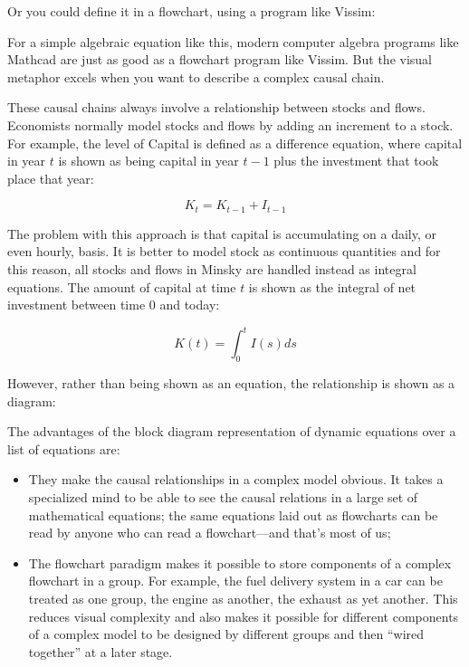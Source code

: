 Or you could define it in a flowchart, using a program like Vissim:

\begin{center}
\end{center}

For a simple algebraic equation like this, modern computer algebra
programs like Mathcad are just as good as a flowchart program like
Vissim. But the visual metaphor excels when you want to describe a
complex causal chain.


These causal chains always involve a relationship between stocks and
flows. Economists normally model stocks and flows by adding an
increment to a stock. For example, the level of Capital is defined as
a difference equation, where capital in year $t$ is shown as being 
capital in year $t-1$ plus the investment that took place that year:

\begin{displaymath}
K_t=K_{t-1}+I_{t-1}
\end{displaymath}

The problem with this approach is that capital is accumulating on a daily, 
or even hourly, basis. It is better to model stock as continuous quantities
and for this reason, all stocks and flows in Minsky are handled instead 
as integral equations. The amount of capital at time $t$ is shown as 
the integral of net investment between time 0 and today:

\begin{displaymath}
K(t)=\int_0^t I(s)ds
\end{displaymath}

However, rather than being shown as an equation, the relationship is shown as a diagram:

\begin{center}
\end{center}

The advantages of the block diagram representation of dynamic equations
over a list of equations are:
\begin{itemize}
\item    They make the causal relationships in a complex model
  obvious. It takes a specialized mind to be able to see the causal
  relations in a large set of mathematical equations; the same
  equations laid out as flowcharts can be read by anyone who can read
  a flowchart---and that's most of us;
\item The flowchart paradigm makes it possible to store components of
  a complex flowchart in a group. For example, the fuel delivery
  system in a car can be treated as one group, the engine as another,
  the exhaust as yet another. This reduces visual complexity and also
  makes it possible for different components of a complex model to be
  designed by different groups and then ``wired together'' at a later
  stage.
\end{itemize}

